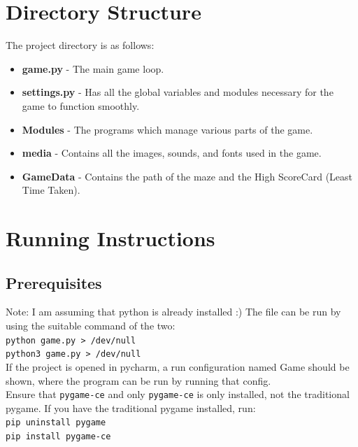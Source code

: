 \documentclass[10pt]{article}
\begin{document}
    \section{Directory Structure}\label{sec:directory-structure}
    The project directory is as follows:




    \begin{itemize}
        \item \textbf{game.py} - The main game loop.
        \item \textbf{settings.py} - Has all the global variables and modules necessary for the game to function smoothly.
        \item \textbf{Modules} - The programs which manage various parts of the game.
        \item \textbf{media} - Contains all the images, sounds, and fonts used in the game.
        \item \textbf{GameData} - Contains the path of the maze and the High ScoreCard (Least Time Taken).
    \end{itemize}


    \section{Running Instructions}\label{sec:running-instructions}

    \subsection{Prerequisites}\label{subsec:prerequisites)}
    Note: I am assuming that python is already installed :)
    The file can be run by using the suitable command of the two: \\
    \texttt{python game.py > /dev/null} \\
    \texttt{python3 game.py > /dev/null} \\
    If the project is opened in pycharm, a run configuration named Game should be shown, where the program can be run by running that config.\\
    Ensure that \texttt{pygame-ce} and only \texttt{pygame-ce} is only installed, not the traditional pygame.
    If you have the traditional pygame installed, run: \\
    \texttt{pip uninstall pygame} \\
    \texttt{pip install pygame-ce}
\end{document}

